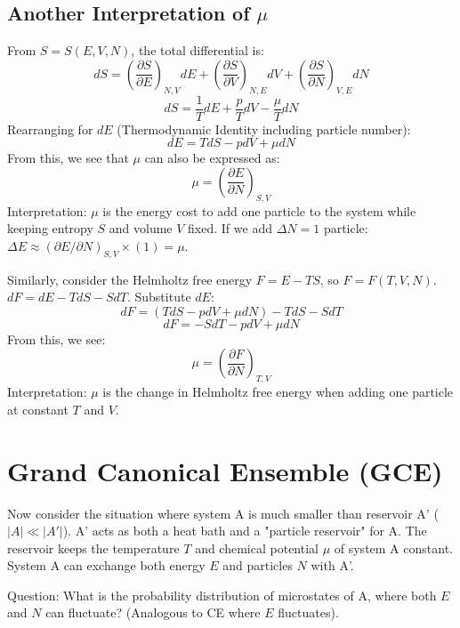 \documentclass[11pt]{article}
\newcommand{\pderiv}[2]{\frac{\partial #1}{\partial #2}}
\begin{document}
\subsection*{Another Interpretation of $\mu$}
From $S=S(E, V, N)$, the total differential is:
\[ dS = \left(\pderiv{S}{E}\right)_{N,V} dE + \left(\pderiv{S}{V}\right)_{N,E} dV + \left(\pderiv{S}{N}\right)_{V,E} dN \]
\[ dS = \frac{1}{T} dE + \frac{p}{T} dV - \frac{\mu}{T} dN \]
Rearranging for $dE$ (Thermodynamic Identity including particle number):
\[ dE = T dS - p dV + \mu dN \]
From this, we see that $\mu$ can also be expressed as:
\[ \mu = \left( \pderiv{E}{N} \right)_{S,V} \]
Interpretation: $\mu$ is the energy cost to add one particle to the system while keeping entropy $S$ and volume $V$ fixed.
If we add $\Delta N=1$ particle: $\Delta E \approx (\partial E / \partial N)_{S,V} \times (1) = \mu$.

Similarly, consider the Helmholtz free energy $F = E - TS$, so $F=F(T, V, N)$.
$dF = dE - T dS - S dT$. Substitute $dE$:
\[ dF = (T dS - p dV + \mu dN) - T dS - S dT \]
\[ dF = -S dT - p dV + \mu dN \]
From this, we see:
\[ \mu = \left( \pderiv{F}{N} \right)_{T,V} \]
Interpretation: $\mu$ is the change in Helmholtz free energy when adding one particle at constant $T$ and $V$.

\section*{Grand Canonical Ensemble (GCE)}

Now consider the situation where system A is much smaller than reservoir A' ($|A| \ll |A'|$). A' acts as both a heat bath and a "particle reservoir" for A. The reservoir keeps the temperature $T$ and chemical potential $\mu$ of system A constant. System A can exchange both energy $E$ and particles $N$ with A'.

\begin{center}
\end{center}
Question: What is the probability distribution of microstates of A, where both $E$ and $N$ can fluctuate? (Analogous to CE where $E$ fluctuates).
\end{document}
